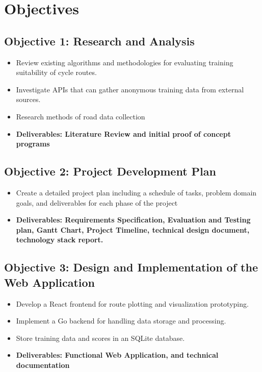\documentclass{article}
\begin{document}
\section{Objectives}
\subsection{Objective 1: Research and Analysis}
\begin{itemize}
\item Review existing algorithms and methodologies for evaluating training suitability of cycle routes.
\item Investigate APIs that can gather anonymous training data from external sources.
\item Research methods of road data collection
\item \textbf{Deliverables: Literature Review and initial proof of concept programs}
\end{itemize}

\subsection{Objective 2: Project Development Plan}
\begin{itemize}
\item Create a detailed project plan including a schedule of tasks, problem domain goals, and deliverables for each phase of the project
\item \textbf{Deliverables: Requirements Specification, Evaluation and Testing plan, Gantt Chart, Project Timeline, technical design document, technology stack report.}
\end{itemize}

\subsection{Objective 3: Design and Implementation of the Web Application}
\begin{itemize}
\item Develop a React frontend for route plotting and visualization prototyping.
\item Implement a Go backend for handling data storage and processing.
\item Store training data and scores in an SQLite database.
\item \textbf{Deliverables: Functional Web Application, and technical documentation}
\end{itemize}
\end{document}

